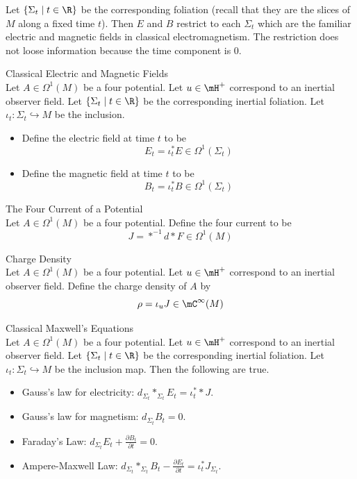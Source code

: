 \documentclass[a4paper]{article}
\begin{document}
Let $\{\Sigma_t\;|\;t\in\R\}$ be the corresponding foliation (recall that they are the slices of $M$ along a fixed time $t$). Then $E$ and $B$ restrict to each $\Sigma_t$ which are the familiar electric and magnetic fields in classical electromagnetism. The restriction does not loose information because the time component is $0$. 

\begin{defn}{Classical Electric and Magnetic Fields}{}\\
Let $A\in\Omega^1(M)$ be a four potential. Let $u\in\mH^+$ correspond to an inertial observer field. Let $\{\Sigma_t\;|\;t\in\R\}$ be the corresponding inertial foliation. Let $\iota_t:\Sigma_t\hookrightarrow M$ be the inclusion. 
\begin{itemize}
\item Define the electric field at time $t$ to be $$E_t=\iota_t^\ast E\in\Omega^1(\Sigma_t)$$
\item Define the magnetic field at time $t$ to be $$B_t=\iota_t^\ast B\in\Omega^1(\Sigma_t)$$
\end{itemize}
\end{defn}

\begin{defn}{The Four Current of a Potential}{}\\
Let $A\in\Omega^1(M)$ be a four potential. Define the four current to be $$J=\ast^{-1}d\ast F\in\Omega^1(M)$$
\end{defn}

\begin{defn}{Charge Density}{}\\
Let $A\in\Omega^1(M)$ be a four potential. Let $u\in\mH^+$ correspond to an inertial observer field. Define the charge density of $A$ by $$\rho=\iota_u J\in\mC^\infty(M)$$
\end{defn}

\begin{thm}{Classical Maxwell's Equations}{}\\
Let $A\in\Omega^1(M)$ be a four potential. Let $u\in\mH^+$ correspond to an inertial observer field. Let $\{\Sigma_t\;|\;t\in\R\}$ be the corresponding inertial foliation. Let $\iota_t:\Sigma_t\hookrightarrow M$ be the inclusion map. Then the following are true. 
\begin{itemize}
\item Gauss's law for electricity: $d_{\Sigma_t}\ast_{\Sigma_t}E_t=\iota_t^\ast\ast J$. 
\item Gauss's law for magnetism: $d_{\Sigma_t}B_t=0$. 
\item Faraday's Law: $d_{\Sigma_t}E_t+\frac{\partial B_t}{\partial t}=0$. 
\item Ampere-Maxwell Law: $d_{\Sigma_t}\ast_{\Sigma_t}B_t-\frac{\partial E_t}{\partial t}=\iota_t^\ast J_{\Sigma_t}$. 
\end{itemize}
\end{thm}
\end{document}
